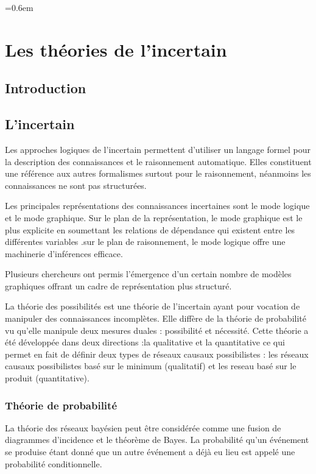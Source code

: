 \parskip=0.6em
\chapter{Les théories de l'incertain}

{}
\section*{Introduction}
\section{L’incertain}

Les approches logiques de l’incertain permettent d’utiliser un langage formel pour la description des connaissances et le raisonnement automatique. Elles constituent une référence aux autres formalismes surtout pour le raisonnement, néanmoins les connaissances ne  sont pas structurées.

Les principales représentations des connaissances incertaines sont le mode logique et le mode graphique.
Sur le plan de la représentation, le mode graphique est le plus explicite en soumettant les relations de dépendance qui existent entre les différentes variables .sur le plan de raisonnement, le mode logique offre une machinerie d’inférences efficace.

Plusieurs chercheurs ont permis l’émergence d’un certain nombre de modèles graphiques offrant un cadre de représentation plus structuré.

La théorie des possibilités est une théorie de l’incertain ayant pour vocation de manipuler des connaissances incomplètes. Elle diffère de la théorie de probabilité  vu qu'elle manipule deux mesures duales : possibilité et nécessité. Cette théorie a été développée dans deux directions :la qualitative et la quantitative ce qui permet en fait de définir deux types de réseaux causaux possibilistes : les réseaux causaux possibilistes basé sur le minimum (qualitatif) et les reseau basé sur le produit (quantitative).
\subsection{Théorie de probabilité}

La théorie des réseaux bayésien peut être considérée comme une fusion de diagrammes d'incidence et le théorème de Bayes. La probabilité qu'un événement se produise étant donné que un autre événement a déjà eu lieu est appelé une probabilité conditionnelle. 

